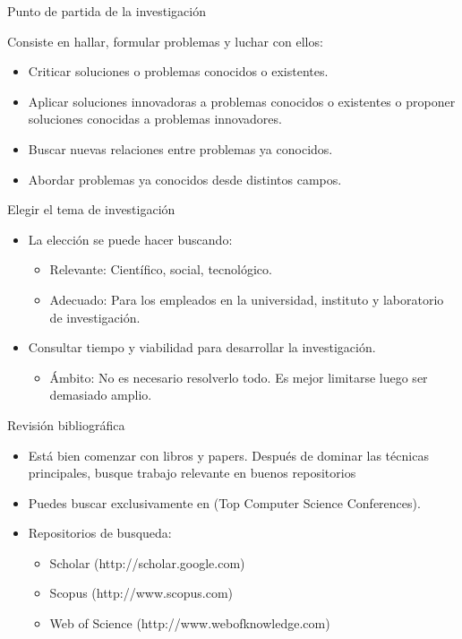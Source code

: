 \begin{frame}{Punto de partida de la investigación}
\begin{block}{}
Consiste en hallar, formular problemas y luchar con ellos:
\begin{itemize}
    \item Criticar soluciones o problemas conocidos o existentes.
    \item Aplicar soluciones innovadoras a problemas conocidos o existentes o proponer soluciones conocidas a problemas innovadores.
    \item Buscar nuevas relaciones entre problemas ya conocidos.
    \item Abordar problemas ya conocidos desde distintos campos.
\end{itemize}
\end{block} 
\end{frame}
        
\begin{frame}{Elegir el tema de investigación}
\begin{block}{}
\begin{itemize}
    \item La elección se puede hacer buscando:
    \begin{itemize}
        \item Relevante:  Científico, social, tecnológico.
        \item Adecuado:  Para los empleados en la universidad, instituto y laboratorio de investigación.
    \end{itemize}
    \item Consultar tiempo y viabilidad para desarrollar la investigación. 
    \begin{itemize}
        \item Ámbito: No es necesario resolverlo todo. Es mejor limitarse luego ser demasiado amplio.
    \end{itemize}
\end{itemize}
\end{block} 
\end{frame}

\begin{frame}{Revisión bibliográfica}
\begin{block}{}
\begin{itemize}
    \item Está bien comenzar con libros y papers. Después de dominar las técnicas principales, busque trabajo relevante en buenos repositorios
    \item Puedes buscar exclusivamente en (Top Computer Science Conferences).
    \item Repositorios de busqueda:
    \begin{itemize}
        \item Scholar (http://scholar.google.com) 
        \item Scopus (http://www.scopus.com)
        \item  Web of Science (http://www.webofknowledge.com)
    \end{itemize}
\end{itemize}
\end{block}
\end{frame}

